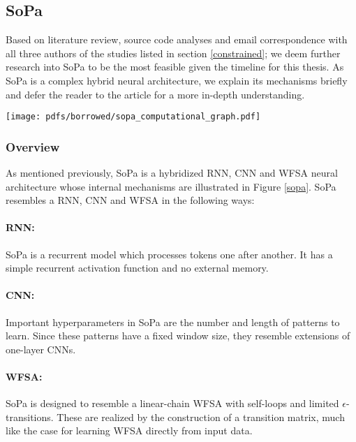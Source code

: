 \subsection{SoPa}

Based on literature review, source code analyses and email correspondence with all three authors of the studies listed in section \ref{constrained}; we deem further research into SoPa to be the most feasible given the timeline for this thesis. As SoPa is a complex hybrid neural architecture, we explain its mechanisms briefly and defer the reader to the article for a more in-depth understanding.

\begin{figure*}
  \centering 
  \texttt{[image: pdfs/borrowed/sopa\_computational\_graph.pdf]} 
  \caption{Schematic of the SoPa neural architecture \citep{schwartz2018sopa}}
  \label{sopa}
\end{figure*}

\subsubsection{Overview}

As mentioned previously, SoPa is a hybridized RNN, CNN and WFSA neural architecture whose internal mechanisms are illustrated in Figure \ref{sopa}. SoPa resembles a RNN, CNN and WFSA in the following ways:

\paragraph{RNN:} SoPa is a recurrent model which processes tokens one after another. It has a simple recurrent activation function and no external memory.

\paragraph{CNN:} Important hyperparameters in SoPa are the number and length of patterns to learn. Since these patterns have a fixed window size, they resemble extensions of one-layer CNNs.

\paragraph{WFSA:} SoPa is designed to resemble a linear-chain WFSA with self-loops and limited $\epsilon$-transitions. These are realized by the construction of a transition matrix, much like the case for learning WFSA directly from input data.

